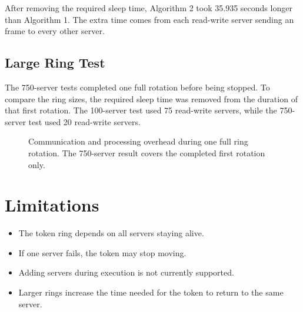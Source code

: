 \documentclass[12pt,a4paper,english]{article}
\newcommand{\cod}[1]{{\fontfamily{qcr}\selectfont{\small#1}}}
\begin{document}
After removing the required sleep time, Algorithm 2 took 35.935 seconds longer than Algorithm 1. The extra time comes from each read-write server sending an \cod{UPDATE} frame to every other server.

\subsection{Large Ring Test}

The 750-server tests completed one full rotation before being stopped. To compare the ring sizes, the required sleep time was removed from the duration of that first rotation. The 100-server test used 75 read-write servers, while the 750-server test used 20 read-write servers.

\begin{figure}[H]
\centering
{}
\caption{Communication and processing overhead during one full ring rotation. The 750-server result covers the completed first rotation only.}
\label{fig:large-ring-test}
\end{figure}

\section{Limitations}

\begin{itemize}
	\item The token ring depends on all servers staying alive.
	\item If one server fails, the token may stop moving.
	\item Adding servers during execution is not currently supported.
	\item Larger rings increase the time needed for the token to return to the same server.
\end{itemize}
\end{document}
